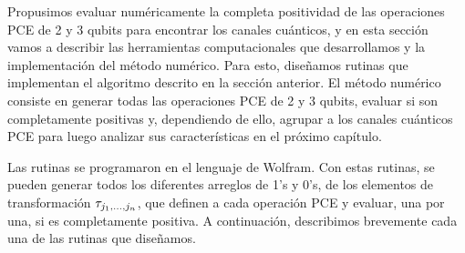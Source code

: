 Propusimos evaluar numéricamente la completa positividad de las 
operaciones PCE de 2 y 3 qubits para encontrar los  
canales cuánticos, y en esta sección vamos a describir las herramientas
computacionales que desarrollamos y la implementación 
del método numérico. Para esto, diseñamos rutinas que 
implementan el algoritmo descrito en la sección anterior.
El método numérico consiste en generar todas 
las operaciones PCE de 2 y 3 qubits, evaluar si son completamente positivas
y, dependiendo de ello, agrupar a los canales cuánticos PCE para luego 
analizar sus características en el próximo capítulo.

Las rutinas se programaron en el lenguaje de Wolfram.
Con estas rutinas, se pueden generar
todos los diferentes arreglos de 1's y 0's, de los elementos de 
transformación $\tau_{j_1,\ldots ,j_n}$,
que definen a cada operación PCE y evaluar, una por una, si
es completamente positiva.
A continuación, describimos brevemente cada una de las rutinas que diseñamos.
